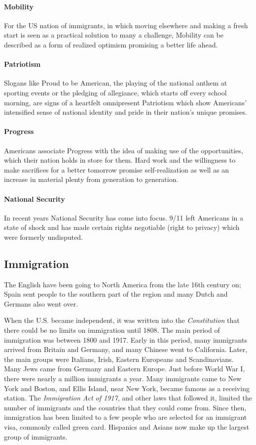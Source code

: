 \documentclass[10pt]{article}
\begin{document}
\paragraph{Mobility}
For the US nation of immigrants, in which moving elsewhere and making a fresh
start is seen as a practical solution to many a challenge, Mobility can be described as a
form of realized optimism promising a better life ahead.

\paragraph{Patriotism}
Slogans like Proud to be American, the playing of the national anthem at sporting
events or the pledging of allegiance, which starts off every school morning, are
signs of a heartfelt omnipresent Patriotism which show Americans' intensified sense of
national identity and pride in their nation's unique promises.

\paragraph{Progress}
Americans associate Progress with the idea of making use of the opportunities, which
their nation holds in store for them. Hard work and the willingness to make sacrifices
for a better tomorrow promise self-realization as well as an increase in
material plenty from generation to generation.

\paragraph{National Security}
In recent years National Security has come into focus. 9/11 left Americans in a state of shock
and has made certain rights negotiable (right to privacy) which were formerly
undisputed.
\subsection{Immigration}
	\label{ssec:usa@immig}
The English have been going to North America from the late 16th century on; Spain sent people to the
southern part of the region and many Dutch and Germans also went over.

When the U.S. became independent, it was written into the \emph{Constitution} that there could be no
limits on immigration until 1808. The main period of immigration was between 1800 and 1917. Early
in this period, many immigrants arrived from Britain and Germany, and many Chinese went to
California. Later, the main groups were Italians, Irish, Eastern Europeans and Scandinavians. Many
Jews came from Germany and Eastern Europe. Just before World War I, there were nearly a million
immigrants a year. Many immigrants came to New York and Boston, and Ellis Island, near New York,
became famous as a receiving station. The \emph{Immigration Act of 1917}, and other laws that followed it,
limited the number of immigrants and the countries that they could come from. Since then,
immigration has been limited to a few people who are selected for an immigrant visa, commonly
called green card. Hispanics and Asians now make up the largest group of immigrants.
\end{document}
